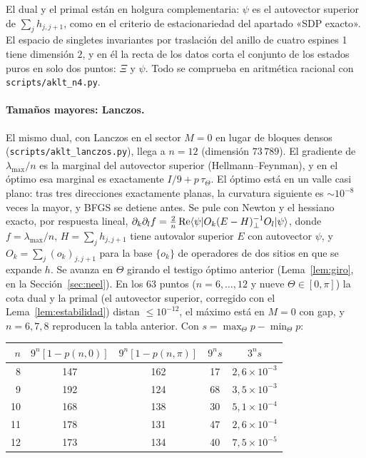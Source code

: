 \documentclass[11pt,a4paper]{article}
\theoremstyle{remark}
\newcommand{\ket}[1]{|#1\rangle}
\newcommand{\bra}[1]{\langle #1|}
\begin{document}
El dual y el primal están en holgura complementaria: $\psi$ es el autovector superior de
$\sum_jh_{j,j+1}$, como en el criterio de estacionariedad del apartado «SDP exacto». El espacio de
singletes invariantes por traslación del anillo de cuatro espines 1 tiene dimensión $2$, y en él
la recta de los datos corta el conjunto de los estados puros en solo dos puntos: $\Xi$ y $\psi$. Todo
se comprueba en aritmética racional con \texttt{scripts/aklt\_n4.py}.

\paragraph{Tamaños mayores: Lanczos.} El mismo dual, con Lanczos en el sector $M=0$ en lugar de
bloques densos (\texttt{scripts/aklt\_lanczos.py}), llega a $n=12$ (dimensión $73\,789$). El
gradiente de $\lambda_{\max}/n$ es la marginal del autovector superior (Hellmann--Feynman), y en
el óptimo esa marginal es exactamente $I/9+p\,\tau_\Theta$. El óptimo está en un valle casi plano:
tras tres direcciones exactamente planas, la curvatura siguiente es $\sim10^{-8}$ veces la mayor, y
BFGS se detiene antes. Se pule con Newton y el hessiano exacto, por respuesta lineal,
$\partial_k\partial_lf=\tfrac2n\,{\rm Re}\bra\psi O_k(E-H)^{-1}_\perp O_l\ket\psi$, donde
$f=\lambda_{\max}/n$, $H=\sum_jh_{j,j+1}$ tiene autovalor superior $E$ con autovector $\psi$, y
$O_k=\sum_j(o_k)_{j,j+1}$ para la base $\{o_k\}$ de operadores de dos sitios en que se expande $h$. Se avanza en
$\Theta$ girando el testigo óptimo anterior (Lema~\ref{lem:giro}, en la Sección~\ref{sec:neel}). En los 63 puntos ($n=6,\dots,12$
y nueve $\Theta\in[0,\pi]$) la cota dual y la primal (el autovector superior, corregido con el
Lema~\ref{lem:estabilidad}) distan $\le10^{-12}$, el máximo está en $M=0$ con gap, y $n=6,7,8$
reproducen la tabla anterior. Con $s=\max_\Theta p-\min_\Theta p$:
\begin{center}\small
\begin{tabular}{rcccc}
\toprule
$n$ & $9^n[1-p(n,0)]$ & $9^n[1-p(n,\pi)]$ & $9^n s$ & $3^n s$\\
\midrule
8 & 147 & 162 & 17 & $2{,}6\times10^{-3}$\\
9 & 192 & 124 & 68 & $3{,}5\times10^{-3}$\\
10 & 168 & 138 & 30 & $5{,}1\times10^{-4}$\\
11 & 178 & 131 & 47 & $2{,}6\times10^{-4}$\\
12 & 173 & 134 & 40 & $7{,}5\times10^{-5}$\\
\bottomrule
\end{tabular}
\end{center}
\end{document}
